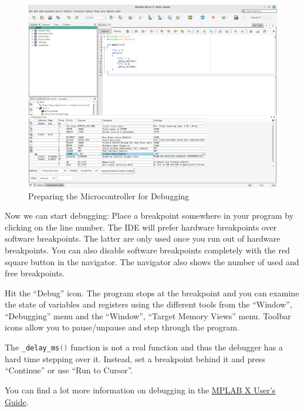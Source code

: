 \documentclass{article}
\newenvironment{note}{\begin{tcolorbox}[colback=blue!5!white,colframe=blue!75!black,title=\textbf{Note}]}{\end{tcolorbox}}
\begin{document}
\begin{figure}[htb]
\centering
\includegraphics[width=\textwidth]{Pictures/DebugMPLABX1.png}
\caption{Preparing the Microcontroller for Debugging}
\label{fig:debugMplabX1}
\end{figure}

Now we can start debugging: Place a breakpoint somewhere in your program by clicking on the line number. The IDE will prefer hardware breakpoints over software breakpoints. The latter are only used once you run out of hardware breakpoints. You can also disable software breakpoints completely with the red square button in the navigator. The navigator also shows the number of used and free breakpoints. 

Hit the ``Debug'' icon. The program stops at the breakpoint and you can examine the state of variables and registers using the different tools from the ``Window'', ``Debugging'' menu and the ``Window'', ``Target Memory Views'' menu. Toolbar icons allow you to pause/unpause and step through the program. 

\begin{note}
The \lstinline[language=C]{_delay_ms()} function is not a real function and thus the debugger has a hard time stepping over it. Instead, set a breakpoint behind it and press ``Continue'' or use ``Run to Cursor''. 
\end{note}

You can find a lot more information on debugging in the \href{https://ww1.microchip.com/downloads/en/DeviceDoc/50002027E.pdf}{MPLAB X User's Guide}. 
\end{document}
